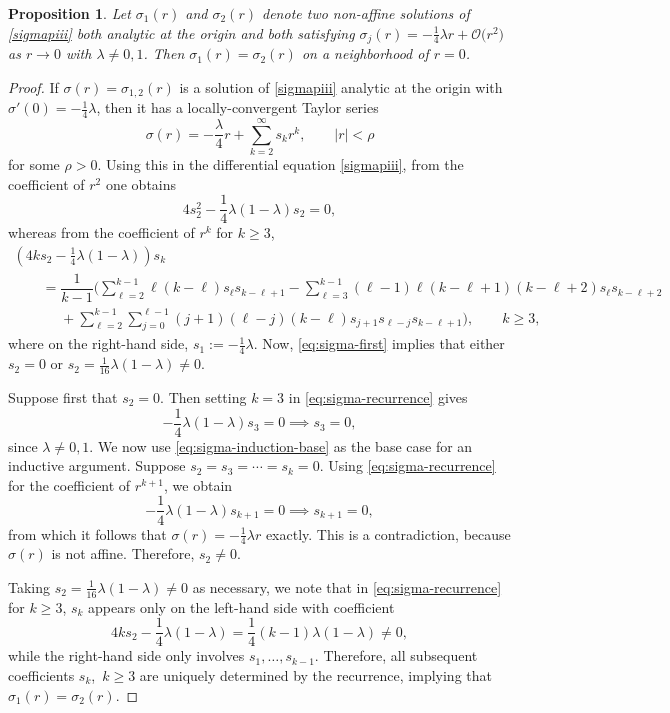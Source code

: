 \documentclass[pdftex]{sigma}
\numberwithin{equation}{section}
\newtheorem{prop}[Theorem]{Proposition}
 { \theoremstyle{definition}
\newtheorem{Definition}[Theorem]{Definition}
\newtheorem{Note}[Theorem]{Note}
\newtheorem{Example}[Theorem]{Example}
\newtheorem{Remark}[Theorem]{Remark} }
\begin{document}
 \begin{prop}
 \label{prop:sigma-unique}
 Let $\sigma_1(r)$ and $\sigma_2(r)$ denote two non-affine solutions of \eqref{sigmapiii} both analytic at the origin and both satisfying $\sigma_j(r)=-\frac{1}{4}\lambda r + \mathcal{O}\big(r^2\big)$ as $r\to 0$ with $\lambda\neq 0,1$. Then $\sigma_1(r)=\sigma_2(r)$ on a neighborhood of $r=0$.
 \end{prop}
 \begin{proof}
 If $\sigma(r)=\sigma_{1,2}(r)$ is a solution of \eqref{sigmapiii} analytic at the origin with $\sigma'(0)=-\frac{1}{4}\lambda$, then it has a locally-convergent Taylor series
 \[
 \sigma(r)=-\frac{\lambda}{4} r + \sum_{k=2}^\infty s_kr^k,\qquad |r|<\rho
 \]
 for some $\rho>0$. Using this in the differential equation \eqref{sigmapiii}, from the coefficient of $r^2$ one obtains
 \begin{equation}
 4 s_2^2 -\frac{1}{4}\lambda(1-\lambda)s_2 = 0,
 \label{eq:sigma-first}
 \end{equation}
 whereas from the coefficient of $r^k$ for $k\ge 3$,
 \begin{gather}
 \left(4k s_2 - \frac{1}{4}\lambda (1 -\lambda)\right)s_k \nonumber\\
 \qquad = \dfrac{1}{k - 1} \Bigg( \sum_{\ell = 2}^{k - 1} \ell(k - \ell) s_{\ell } s_{k - \ell+1} - \sum_{\ell = 3}^{k - 1}(\ell - 1)\ell(k - \ell + 1)(k - \ell+2) s_{\ell } s_{k - \ell+2} \nonumber\\
 \phantom{\qquad =}{}+ \sum_{\ell = 2}^{k - 1} \sum_{j = 0}^{\ell-1}(j + 1)(\ell - j ) (k-\ell)s_{j+1} s_{\ell - j} s_{k - \ell+1}\Bigg) , \qquad k\geq 3,
 \label{eq:sigma-recurrence}
 \end{gather}
 where on the right-hand side, $s_1:=-\frac{1}{4}\lambda$. Now, \eqref{eq:sigma-first} implies that either $s_2=0$ or $s_2=\frac{1}{16}\lambda(1-\lambda)\neq 0$.

 Suppose first that $s_2=0$. Then setting $k=3$ in \eqref{eq:sigma-recurrence} gives
 \begin{equation}
 -\frac{1}{4}\lambda(1-\lambda)s_3=0\implies s_3=0,
 \label{eq:sigma-induction-base}
 \end{equation}
 since $\lambda\neq 0,1$. We now use \eqref{eq:sigma-induction-base} as the base case for an inductive argument. Suppose ${s_2=s_3=\cdots=s_k=0}$. Using \eqref{eq:sigma-recurrence} for the coefficient of $r^{k+1}$, we obtain
 \[
 -\frac{1}{4}\lambda(1-\lambda)s_{k+1}=0\implies s_{k+1}=0,
 \]
 from which it follows that $\sigma(r)=-\frac{1}{4}\lambda r$ exactly. This is a contradiction, because $\sigma(r)$ is not affine. Therefore, $s_2\neq 0$.

 Taking $s_2=\frac{1}{16}\lambda(1-\lambda)\neq 0$ as necessary, we note that in \eqref{eq:sigma-recurrence} for $k\ge 3$, $s_k$ appears only on the left-hand side with coefficient
 \[
 4ks_2 -\frac{1}{4}\lambda(1-\lambda) = \frac{1}{4}(k-1)\lambda(1-\lambda)\neq 0,
 \]
 while the right-hand side only involves $s_1,\dots,s_{k-1}$. Therefore, all subsequent coefficients $s_k$,~${k\!\ge \!3}$ are uniquely determined by the recurrence, implying that $\sigma_1(r)=\sigma_2(r)$.
 \end{proof}
\end{document}
